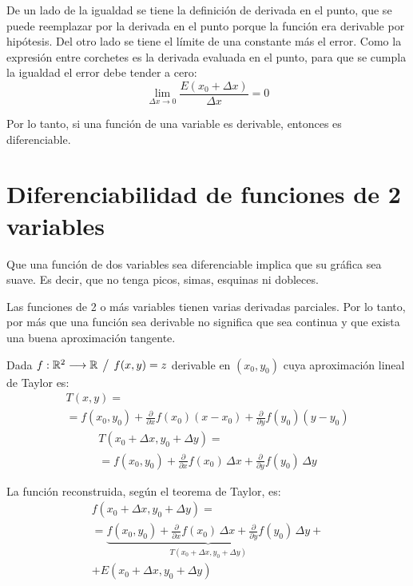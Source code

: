 \documentclass[a5paper,12pt,twoside]{book}
\begin{document}
De un lado de la igualdad se tiene la definición de derivada en el punto, que se puede reemplazar por la derivada en el punto porque la función era derivable por hipótesis.
Del otro lado se tiene el límite de una constante más el error.
Como la expresión entre corchetes es la derivada evaluada en el punto, para que se cumpla la igualdad el error debe tender a cero:
\begin{equation*}
    \lim_{\Delta x \to 0} \frac{E(x_0 + \Delta x)}{\Delta x} = 0
\end{equation*}

Por lo tanto, si una función de una variable es derivable, entonces es diferenciable.


\section{Diferenciabilidad de funciones de 2 variables}

Que una función de dos variables sea diferenciable implica que su gráfica sea suave.
Es decir, que no tenga picos, simas, esquinas ni dobleces.

Las funciones de 2 o más variables tienen varias derivadas parciales.
Por lo tanto, por más que una función sea derivable no significa que sea continua y que exista una buena aproximación tangente.

Dada $f: \mathbb{R}^2 \longrightarrow \mathbb{R} \hspace{1ex} \big/ \hspace{1ex} f(x,y)=z$ derivable en $(x_0,y_0)$ cuya aproximación lineal de Taylor es:
\begin{multline*}
    T(x,y) =
    \\
    = f(x_0,y_0) + \frac{\partial}{\partial x} f(x_0) \left( x-x_0 \right) + \frac{\partial}{\partial y} f(y_0) \left( y-y_0 \right)
\end{multline*}
\begin{multline*}
    T(x_0 + \Delta x,y_0 + \Delta y) =
    \\
    = f(x_0,y_0) + \frac{\partial}{\partial x} f(x_0) \, \Delta x + \frac{\partial}{\partial y} f(y_0) \, \Delta y
\end{multline*}

La función reconstruida, según el teorema de Taylor, es:
\begin{multline*}
    f(x_0 + \Delta x,y_0 + \Delta y) =
    \\
    = \underbrace{f(x_0,y_0) + \frac{\partial}{\partial x} f(x_0) \, \Delta x + \frac{\partial}{\partial y} f(y_0) \, \Delta y}_{T(x_0 + \Delta x,y_0 + \Delta y)} +
    \\
    + E(x_0 + \Delta x,y_0 + \Delta y)
\end{multline*}
\end{document}
